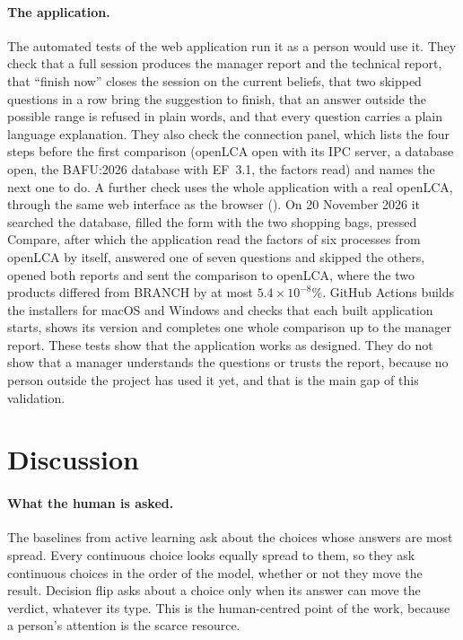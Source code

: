 \documentclass{article}
\begin{document}
\paragraph{The application.}
The automated tests of the web application run it as a person would use it. They check that a full
session produces the manager report and the technical report, that ``finish now'' closes the session on
the current beliefs, that two skipped questions in a row bring the suggestion to finish, that an answer
outside the possible range is refused in plain words, and that every question carries a plain language
explanation. They also check the connection panel, which lists the four steps before the first comparison
(openLCA open with its IPC server, a database open, the BAFU:2026 database with EF~3.1, the factors read)
and names the next one to do. A further check uses the whole application with a real openLCA, through the same web
interface as the browser (). On 20 November 2026 it searched the database, filled
the form with the two shopping bags, pressed Compare, after which the application read the factors of six processes
from openLCA by itself, answered one of seven questions and skipped the others, opened both reports and sent the comparison to openLCA,
where the two products differed from BRANCH by at most $5.4\times10^{-8}$\%. GitHub Actions builds the installers for macOS and Windows and checks that each built
application starts, shows its version and completes one whole comparison up to the manager report. These tests show that the application works as designed. They do
not show that a manager understands the questions or trusts the report, because no person outside the
project has used it yet, and that is the main gap of this validation.

\section{Discussion}\label{sec:discussion}

\paragraph{What the human is asked.}
The baselines from active learning ask about the choices whose answers are most spread. Every continuous
choice looks equally spread to them, so they ask continuous choices in the order of the model, whether or
not they move the result. Decision flip asks about a choice only when its answer can move the
verdict, whatever its type. This is the human-centred point of the work, because a person's
attention is the scarce resource.
\end{document}
